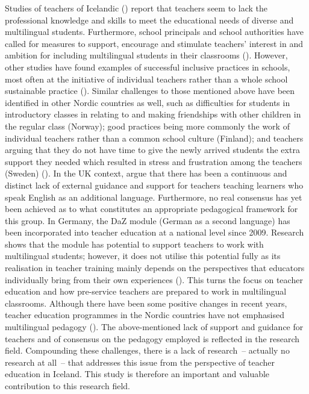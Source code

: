 \documentclass[output=paper]{langscibook}
\begin{document}
Studies of teachers of Icelandic (\citealt{Gunnorsdottir2020-1, Oskarsdottir2017-1}) report that teachers seem to lack the professional knowledge and skills to meet the educational needs of diverse and multilingual students. Furthermore, school principals and school authorities have  called for measures to support, encourage and stimulate teachers’ interest in and ambition for including multilingual students in their classrooms (\citealt{Gunnorsdottir2017-1}). However, other studies have found examples of successful inclusive practices in schools, most often at the initiative of individual teachers rather than a whole school sustainable practice (\citealt{Gujonsdottir2016}). Similar challenges to those mentioned above have been identified in other Nordic countries as well, such as difficulties for students in introductory classes in relating to and making friendships with other children in the regular class (Norway); good practices being more commonly the work of individual teachers rather than a common school culture (Finland); and teachers arguing that they do not have time to give the newly arrived students the extra support they needed which resulted in stress and frustration among the teachers (Sweden) (\citealt{RagnarsdottirKulbrandstad2018}). In the UK context, \citet{FlocktonCunningham2021} argue that there has been a continuous and distinct lack of external guidance and support for teachers teaching learners who speak English as an additional language. Furthermore, no real consensus has yet been achieved as to what constitutes an appropriate pedagogical framework for this group. In Germany, the DaZ module (German as a second language) has been incorporated into teacher education at a national level since 2009. Research shows that the module has potential to support teachers to work with multilingual students; however, it does not utilise this potential fully as its realisation in teacher training mainly depends on the perspectives that educators individually bring from their own experiences (\citealt{GoltsevEtAl2022}). This turns the focus on teacher education and how pre-service teachers are prepared to work in multilingual classrooms. Although there have been some positive changes in recent years, teacher education programmes in the Nordic countries have not emphasised multilingual pedagogy (\citealt{Calafato2020,Iversen2021,KieranAnderson2019,RaudOrehhova2020}). {The above-mentioned lack of support and guidance for teachers and of consensus on the pedagogy employed is reflected in the research field. Compounding these challenges, there is a lack of research~– actually no research at all~– that addresses this issue from the perspective of teacher education in Iceland. This study is therefore an important and valuable contribution to this research field.}
\end{document}
